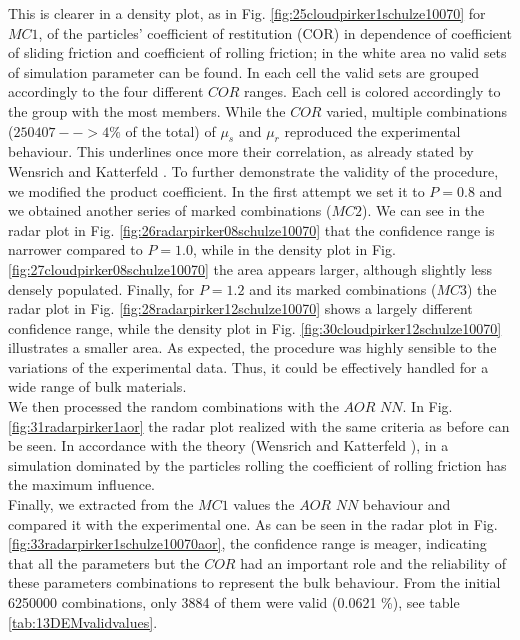 This is clearer in a density plot, as in Fig. 
\ref{fig:25cloudpirker1schulze10070} for $MC1$, 
of the particles' coefficient of restitution (COR) in dependence
of coefficient of sliding friction and coefficient of rolling friction; in the
white area no valid sets of simulation parameter can be found.
In each cell the valid sets are grouped accordingly to the four different $COR$
ranges.
Each cell is colored accordingly to the group with the most members. 
While the $COR$ varied, multiple
combinations ($250407 --> 4\% $ of the total) of $\mu_s$ and $\mu_r$ reproduced
the experimental behaviour.
This underlines once more their correlation, as already stated by Wensrich and 
Katterfeld \cite{RefWorks:87}.
To further demonstrate the validity of the procedure, we modified the product
coefficient. In the first attempt we set it to $P=0.8$ and we obtained another
series of marked combinations ($MC2$).
We can see in the radar plot in Fig.
\ref{fig:26radarpirker08schulze10070} that the confidence range is narrower
compared to $P=1.0$, while in the density plot in Fig. 
\ref{fig:27cloudpirker08schulze10070} the area
appears larger, although slightly less densely populated. Finally, for $P=1.2$
and its marked combinations ($MC3$) the radar plot in Fig.
\ref{fig:28radarpirker12schulze10070} shows a largely different confidence
range, while the density plot in Fig. \ref{fig:30cloudpirker12schulze10070} 
illustrates a smaller area. As expected, the procedure was highly sensible to the variations of the experimental data. 
Thus, it could be effectively handled for a wide range of bulk materials.\\
We then processed the random combinations with the $AOR$ $NN$. In Fig.
\ref{fig:31radarpirker1aor} the radar plot realized with the same criteria as
before can be seen.
In accordance with the theory (Wensrich and Katterfeld \cite{RefWorks:87}), in a simulation dominated
by the particles rolling the coefficient of rolling friction has the maximum
influence. \\
Finally, we extracted from the $MC1$ values the $AOR$ $NN$ behaviour
and compared it with the experimental one.
As can be seen in the radar plot in Fig.
\ref{fig:33radarpirker1schulze10070aor}, the confidence range is meager, indicating that all the parameters but the $COR$ 
had an important role and the reliability of these parameters combinations to represent the bulk behaviour. 
From the initial 6250000 combinations, only 3884 of them were valid (0.0621 \%),
see table \ref{tab:13DEMvalidvalues}.






